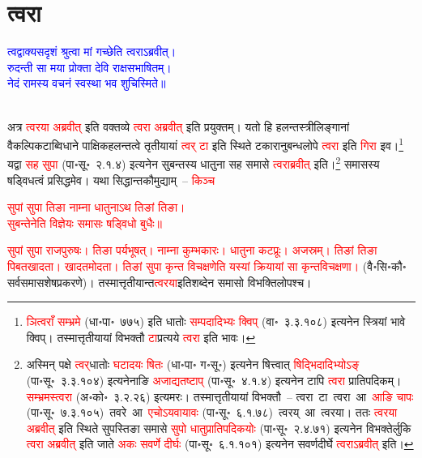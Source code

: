 \section[त्वरा]{त्वरा}
\centering\textcolor{blue}{त्वद्वाक्यसदृशं श्रुत्वा मां गच्छेति त्वराऽब्रवीत्।\nopagebreak\\
रुदन्ती सा मया प्रोक्ता देवि राक्षसभाषितम्।\nopagebreak\\
नेदं रामस्य वचनं स्वस्था भव शुचिस्मिते॥}\nopagebreak\\
\\
\begin{sloppypar}\justifying\noindent\hspace{10mm} अत्र \textcolor{red}{त्वरया अब्रवीत्‌} इति वक्तव्ये \textcolor{red}{त्वरा अब्रवीत्‌} इति प्रयुक्तम्। यतो हि हलन्त\-स्त्री\-लिङ्गानां वैकल्पिक\-टाब्विधाने पाक्षिक\-हलन्तत्वे तृतीयायां \textcolor{red}{त्वर् टा} इति स्थिते टकारानुबन्ध\-लोपे \textcolor{red}{त्वरा} इति \textcolor{red}{गिरा} इव।\footnote{\textcolor{red}{ञित्वराँ सम्भ्रमे} (धा॰पा॰~७७५) इति धातोः \textcolor{red}{सम्पदादिभ्‍यः क्विप्} (वा॰~३.३.१०८) इत्यनेन स्त्रियां भावे क्विप्। तस्मात्तृतीयायां विभक्तौ \textcolor{red}{टा}\-प्रत्यये \textcolor{red}{त्वरा} इति भावः।} यद्वा \textcolor{red}{सह सुपा} (पा॰सू॰~२.१.४) इत्यनेन सुबन्तस्य धातुना सह समासे \textcolor{red}{त्वराब्रवीत्‌} इति।\footnote{अस्मिन् पक्षे \textcolor{red}{त्वर्‌}\-धातोः \textcolor{red}{घटादयः षितः} (धा॰पा॰ ग॰सू॰) इत्यनेन षित्त्वात् \textcolor{red}{षिद्भिदादिभ्योऽङ्} (पा॰सू॰~३.३.१०४) इत्यनेनाङि \textcolor{red}{अजाद्यतष्टाप्‌} (पा॰सू॰~४.१.४) इत्यनेन टापि \textcolor{red}{त्वरा} प्रातिपदिकम्। \textcolor{red}{सम्भ्रमस्त्वरा} (अ॰को॰~३.२.२६) इत्यमरः। तस्मात्तृतीयायां विभक्तौ~– त्वरा~टा~\arrow त्वरा~आ~\arrow \textcolor{red}{आङि चापः} (पा॰सू॰~७.३.१०५)~\arrow तवरे~आ~\arrow \textcolor{red}{एचोऽयवायावः} (पा॰सू॰~६.१.७८)~\arrow त्वरय्~आ~\arrow त्वरया। ततः \textcolor{red}{त्वरया अब्रवीत्‌} इति स्थिते सुपस्तिङा समासे \textcolor{red}{सुपो धातु\-प्रातिपदिकयोः} (पा॰सू॰~२.४.७१) इत्यनेन विभक्तेर्लुकि \textcolor{red}{त्वरा अब्रवीत्‌} इति जाते \textcolor{red}{अकः सवर्णे दीर्घः} (पा॰सू॰~६.१.१०१) इत्यनेन सवर्ण\-दीर्घे \textcolor{red}{त्वराऽब्रवीत्‌} इति।} समासस्य षड्विधत्वं प्रसिद्धमेव। यथा सिद्धान्त\-कौमुद्याम्~– \textcolor{red}{किञ्च}\end{sloppypar}
\centering\textcolor{red}{सुपां सुपा तिङा नाम्ना धातुनाऽथ तिङां तिङा।\nopagebreak\\
सुबन्तेनेति विज्ञेयः समासः षड्विधो बुधैः॥}\\
\begin{sloppypar}\justifying\noindent \textcolor{red}{सुपां सुपा राजपुरुषः। तिङा पर्यभूषत्। नाम्ना कुम्भकारः। धातुना कटप्रूः। अजस्रम्। तिङां तिङा पिबतखादता। खादतमोदता। तिङां सुपा कृन्त विचक्षणेति यस्यां क्रियायां सा कृन्त\-विचक्षणा।} (वै॰सि॰कौ॰ सर्वसमासशेष\-प्रकरणे)। तस्मात्तृतीयान्त\-\textcolor{red}{त्वरया}\-इति\-शब्देन समासो विभक्ति\-लोपश्च।
\end{sloppypar}

